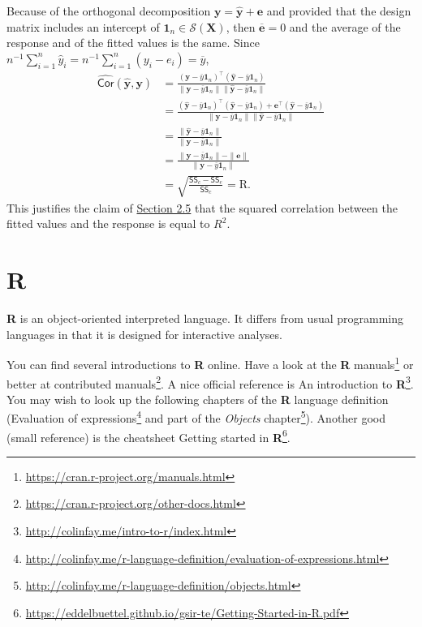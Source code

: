 \documentclass[
  11pt,
  letterpaper,
]{book}
\renewcommand{\href}[2]{#2\footnote{\url{#1}}}
\theoremstyle{definition}
\theoremstyle{definition}
\theoremstyle{definition}
\theoremstyle{remark}
\begin{document}
Because of the orthogonal decomposition \(\boldsymbol{y}=\widehat{\boldsymbol{y}} + \boldsymbol{e}\) and provided that the design matrix includes an intercept of \(\mathbf{1}_n \in \mathcal{S}(\mathbf{X})\), then \(\overline{\boldsymbol{e}}=0\) and the average of the response and of the fitted values is the same. Since \(n^{-1}\sum_{i=1}^n \hat{y}_i = n^{-1}\sum_{i=1}^n ({y}_i-e_i)=\overline{y}\),
\begin{align*}
\widehat{\mathsf{Cor}}\left(\hat{\boldsymbol{y}}, \boldsymbol{y}\right)
&= \frac{(\boldsymbol{y} - \overline{y}\mathbf{1}_n)^\top(\widehat{\boldsymbol{y}} - \overline{y}\mathbf{1}_n)}
{\|\boldsymbol{y} - \overline{y}\mathbf{1}_n\|\|\widehat{\boldsymbol{y}} - \overline{y}\mathbf{1}_n\|}
\\&= \frac{(\widehat{\boldsymbol{y}} - \overline{y}\mathbf{1}_n)^\top(\widehat{\boldsymbol{y}} - \overline{y}\mathbf{1}_n) +
\boldsymbol{e}^\top(\widehat{\boldsymbol{y}} - \overline{y}\mathbf{1}_n)}
{\|\boldsymbol{y} - \overline{y}\mathbf{1}_n\|\|\widehat{\boldsymbol{y}} - \overline{y}\mathbf{1}_n\|}
\\&= \frac{\|\widehat{\boldsymbol{y}} - \overline{y}\mathbf{1}_n\|}
{\|\boldsymbol{y} - \overline{y}\mathbf{1}_n\|}
\\&= \frac{\|\boldsymbol{y} - \overline{y}\mathbf{1}_n\| - \|\boldsymbol{e}\|}
{\|\boldsymbol{y} - \overline{y}\mathbf{1}_n\|}
\\&= \sqrt{\frac{\mathsf{SS}_c-\mathsf{SS}_e}{\mathsf{SS}_c}}= \mathrm{R}.
\end{align*}
This justifies the claim of \protect\hyperlink{coefR2}{Section 2.5} that the squared correlation between the fitted values and the response is equal to \(R^2\).

\hypertarget{r}{%
\chapter{\texorpdfstring{\textbf{R}}{R}}\label{r}}

\textbf{R} is an object-oriented interpreted language. It differs from usual programming languages in that it is designed for interactive analyses.

You can find several introductions to \textbf{R} online. Have a look at the \href{https://cran.r-project.org/manuals.html}{\textbf{R} manuals} or better at \href{https://cran.r-project.org/other-docs.html}{contributed manuals}. A nice official reference is \href{http://colinfay.me/intro-to-r/index.html}{An introduction to \textbf{R}}.
You may wish to look up the following chapters of the \textbf{R} language definition (\href{http://colinfay.me/r-language-definition/evaluation-of-expressions.html}{Evaluation of expressions} and part of the \href{http://colinfay.me/r-language-definition/objects.html}{\emph{Objects} chapter}). Another good (small reference) is the cheatsheet \href{https://eddelbuettel.github.io/gsir-te/Getting-Started-in-R.pdf}{Getting started in \textbf{R}}.
\end{document}
